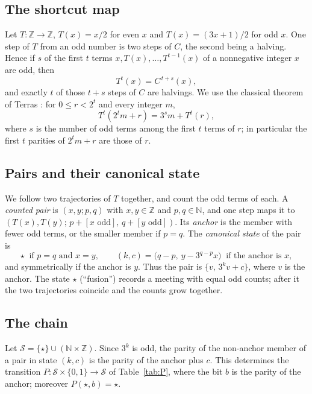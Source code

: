 \documentclass[11pt]{amsart}
\theoremstyle{definition}
\theoremstyle{remark}
\newcommand{\N}{\mathbb{N}}
\newcommand{\Z}{\mathbb{Z}}
\newcommand{\fus}{\star}
\begin{document}
\subsection{The shortcut map}
Let $T\colon\Z\to\Z$, $T(x)=x/2$ for even $x$ and $T(x)=(3x+1)/2$ for odd $x$. One step of $T$ from an odd number is two steps of $C$, the second being a halving. Hence if $s$ of the first $t$ terms $x,T(x),\dots,T^{t-1}(x)$ of a nonnegative integer $x$ are odd, then
\begin{equation}\label{eq:T-to-C}
T^{t}(x)=C^{\,t+s}(x),
\end{equation}
and exactly $t$ of those $t+s$ steps of $C$ are halvings. We use the classical theorem of Terras \cite{Ter76}: for $0\le r<2^t$ and every integer $m$,
\begin{equation}\label{eq:terras}
T^{t}(2^t m+r)=3^{s}m+T^{t}(r),
\end{equation}
where $s$ is the number of odd terms among the first $t$ terms of $r$; in particular the first $t$ parities of $2^tm+r$ are those of $r$.

\subsection{Pairs and their canonical state}
We follow two trajectories of $T$ together, and count the odd terms of each. A \emph{counted pair} is $(x,y;p,q)$ with $x,y\in\Z$ and $p,q\in\N$, and one step maps it to $(T(x),T(y);\,p+[x\text{ odd}],\,q+[y\text{ odd}])$. Its \emph{anchor} is the member with fewer odd terms, or the smaller member if $p=q$. The \emph{canonical state} of the pair is
\[
\fus \ \text{ if } p=q \text{ and } x=y,\qquad
(k,c)=\bigl(q-p,\ y-3^{q-p}x\bigr) \ \text{ if the anchor is } x,
\]
and symmetrically if the anchor is $y$. Thus the pair is $\{v,\,3^k v+c\}$, where $v$ is the anchor. The state $\fus$ (``fusion'') records a meeting with equal odd counts; after it the two trajectories coincide and the counts grow together.

\subsection{The chain}
Let $\mathcal S=\{\fus\}\cup(\N\times\Z)$. Since $3^k$ is odd, the parity of the non-anchor member of a pair in state $(k,c)$ is the parity of the anchor plus $c$. This determines the transition $P\colon\mathcal S\times\{0,1\}\to\mathcal S$ of Table~\ref{tab:P}, where the bit $b$ is the parity of the anchor; moreover $P(\fus,b)=\fus$.
\end{document}
